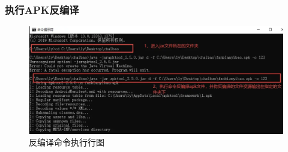 \subsubsection{执行APK反编译}

\begin{figure}
    \centering
    \includegraphics[scale=0.5]{resources/img/i19.png}
    \caption{反编译命令执行行图}
  \end{figure}

